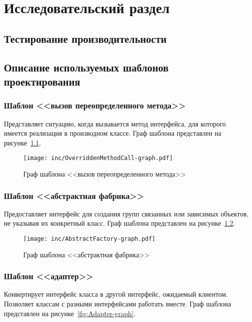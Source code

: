 \chapter{Исследовательский раздел}
\label{cha:research}

\section{Тестирование производительности}

\section{Описание используемых шаблонов проектирования}

\subsection{Шаблон <<вызов переопределенного метода>>}

Представляет ситуацию, когда вызывается метод интерфейса,
для которого имеется реализация в производном классе.
Граф шаблона представлен на рисунке~\ref{fig:OverriddenMethodCall-graph}.

\begin{figure}[!ht]
\centering
\texttt{[image: inc/OverriddenMethodCall-graph.pdf]}
\caption{Граф шаблона <<вызов переопределенного метода>>}
\label{fig:OverriddenMethodCall-graph}
\end{figure}

\subsection{Шаблон <<абстрактная фабрика>>}

Предоставляет интерфейс для создания групп связанных или зависимых объектов,
не указывая их конкретный класс.
Граф шаблона представлен на рисунке~\ref{fig:AbstractFactory-graph}.

\begin{figure}[!ht]
\centering
\texttt{[image: inc/AbstractFactory-graph.pdf]}
\caption{Граф шаблона <<абстрактная фабрика>>}
\label{fig:AbstractFactory-graph}
\end{figure}

\subsection{Шаблон <<адаптер>>}

Конвертирует интерфейс класса в другой интерфейс, ожидаемый клиентом.
Позволяет классам с разными интерфейсами работать вместе.
Граф шаблона представлен на рисунке~\ref{fig:Adapter-graph}.

